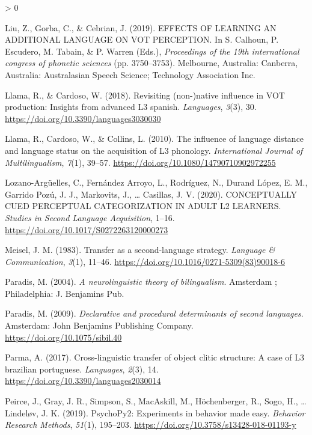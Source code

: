 \documentclass[
  english,
  man]{apa6}
\newlength{\cslhangindent}
\newenvironment{CSLReferences}[2] %
 {%
  \setlength{\parindent}{0pt}
  \ifodd #1 \everypar{\setlength{\hangindent}{\cslhangindent}}\ignorespaces\fi
  \ifnum #2 > 0
  \setlength{\parskip}{#2\baselineskip}
  \fi
 }%
 {}
\begin{document}
\begin{CSLReferences}{1}{0}
\leavevmode\hypertarget{ref-liu_effects_2019}{}%
Liu, Z., Gorba, C., \& Cebrian, J. (2019). {EFFECTS} {OF} {LEARNING} {AN} {ADDITIONAL} {LANGUAGE} {ON} {VOT} {PERCEPTION}. In S. Calhoun, P. Escudero, M. Tabain, \& P. Warren (Eds.), \emph{Proceedings of the 19th international congress of phonetic sciences} (pp. 3750--3753). Melbourne, Australia: Canberra, Australia: Australasian Speech Science; Technology Association Inc.

\leavevmode\hypertarget{ref-llama_revisiting_2018}{}%
Llama, R., \& Cardoso, W. (2018). Revisiting (non-)native influence in {VOT} production: Insights from advanced L3 spanish. \emph{Languages}, \emph{3}(3), 30. \url{https://doi.org/10.3390/languages3030030}

\leavevmode\hypertarget{ref-llama_influence_2010}{}%
Llama, R., Cardoso, W., \& Collins, L. (2010). The influence of language distance and language status on the acquisition of L3 phonology. \emph{International Journal of Multilingualism}, \emph{7}(1), 39--57. \url{https://doi.org/10.1080/14790710902972255}

\leavevmode\hypertarget{ref-lozano-arguelles_conceptually_2020}{}%
Lozano-Argüelles, C., Fernández Arroyo, L., Rodríguez, N., Durand López, E. M., Garrido Pozú, J. J., Markovits, J., \ldots{} Casillas, J. V. (2020). {CONCEPTUALLY} {CUED} {PERCEPTUAL} {CATEGORIZATION} {IN} {ADULT} L2 {LEARNERS}. \emph{Studies in Second Language Acquisition}, 1--16. \url{https://doi.org/10.1017/S0272263120000273}

\leavevmode\hypertarget{ref-meisel_transfer_1983}{}%
Meisel, J. M. (1983). Transfer as a second-language strategy. \emph{Language \& Communication}, \emph{3}(1), 11--46. \url{https://doi.org/10.1016/0271-5309(83)90018-6}

\leavevmode\hypertarget{ref-paradis_neurolinguistic_2004}{}%
Paradis, M. (2004). \emph{A neurolinguistic theory of bilingualism}. Amsterdam ; Philadelphia: J. Benjamins Pub.

\leavevmode\hypertarget{ref-paradis_declarative_2009}{}%
Paradis, M. (2009). \emph{Declarative and procedural determinants of second languages}. Amsterdam: John Benjamins Publishing Company. \url{https://doi.org/10.1075/sibil.40}

\leavevmode\hypertarget{ref-parma_cross-linguistic_2017}{}%
Parma, A. (2017). Cross-linguistic transfer of object clitic structure: A case of L3 brazilian portuguese. \emph{Languages}, \emph{2}(3), 14. \url{https://doi.org/10.3390/languages2030014}

\leavevmode\hypertarget{ref-peirce_psychopy2_2019}{}%
Peirce, J., Gray, J. R., Simpson, S., MacAskill, M., Höchenberger, R., Sogo, H., \ldots{} Lindeløv, J. K. (2019). {PsychoPy}2: Experiments in behavior made easy. \emph{Behavior Research Methods}, \emph{51}(1), 195--203. \url{https://doi.org/10.3758/s13428-018-01193-y}


\end{CSLReferences}
\end{document}
